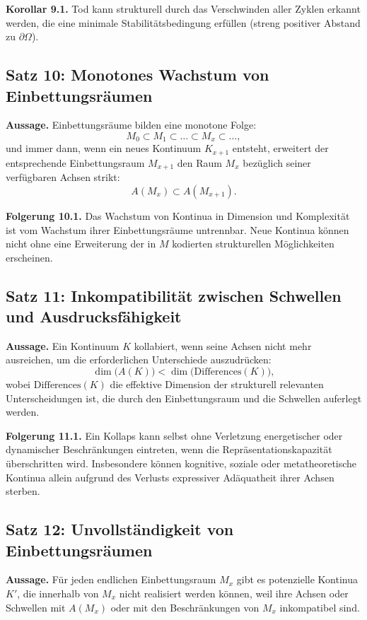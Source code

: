 \textbf{Korollar 9.1.}
Tod kann strukturell durch das Verschwinden aller Zyklen erkannt werden, die eine minimale Stabilitätsbedingung erfüllen (streng positiver Abstand zu \(\partial\Omega\)).

\subsection{Satz 10: Monotones Wachstum von Einbettungsräumen}

\textbf{Aussage.}
Einbettungsräume bilden eine monotone Folge:
\[
    M_0 \subset M_1 \subset \dots \subset M_x \subset \dots,
\]
und immer dann, wenn ein neues Kontinuum \(K_{x+1}\) entsteht, erweitert der entsprechende Einbettungsraum \(M_{x+1}\) den Raum \(M_x\) bezüglich seiner verfügbaren Achsen strikt:
\[
    A(M_{x}) \subset A(M_{x+1}).
\]

\textbf{Folgerung 10.1.}
Das Wachstum von Kontinua in Dimension und Komplexität ist vom Wachstum ihrer Einbettungsräume untrennbar.
Neue Kontinua können nicht ohne eine Erweiterung der in \(M\) kodierten strukturellen Möglichkeiten erscheinen.

\subsection{Satz 11: Inkompatibilität zwischen Schwellen und Ausdrucksfähigkeit}

\textbf{Aussage.}
Ein Kontinuum \(K\) kollabiert, wenn seine Achsen nicht mehr ausreichen, um die erforderlichen Unterschiede auszudrücken:
\[
    \dim\big(A(K)\big) < \dim\big(\mathrm{Differences}(K)\big),
\]
wobei \(\mathrm{Differences}(K)\) die effektive Dimension der strukturell relevanten Unterscheidungen ist, die durch den Einbettungsraum und die Schwellen auferlegt werden.

\textbf{Folgerung 11.1.}
Ein Kollaps kann selbst ohne Verletzung energetischer oder dynamischer Beschränkungen eintreten, wenn die Repräsentationskapazität überschritten wird.
Insbesondere können kognitive, soziale oder metatheoretische Kontinua allein aufgrund des Verlusts expressiver Adäquatheit ihrer Achsen sterben.

\subsection{Satz 12: Unvollständigkeit von Einbettungsräumen}

\textbf{Aussage.}
Für jeden endlichen Einbettungsraum \(M_x\) gibt es potenzielle Kontinua \(K'\), die innerhalb von \(M_x\) nicht realisiert werden können, weil ihre Achsen oder Schwellen mit \(A(M_x)\) oder mit den Beschränkungen von \(M_x\) inkompatibel sind.

